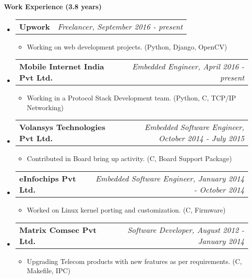 \documentclass[letterpaper,10pt]{article}
\makeatletter
\newcommand{\resitem}[1]{\item #1 \vspace{-2pt}}
\newcommand{\resheading}[1]{{\large \colorbox{mygrey}{\begin{minipage}{\textwidth}{\textbf{#1 \vphantom{p\^{E}}}}\end{minipage}}}}
\newcommand{\ressubheading}[4]{
\begin{tabular*}{7.0in}{l@{\extracolsep{\fill}}r}
		\textbf{#1} & \textit{#4} \\
\end{tabular*}\vspace{-6pt}}
\makeatother
\begin{document}
\resheading{Work Experience (3.8 years)}
\begin{itemize}

\item
	\ressubheading{Upwork}{Remote}{}{Freelancer, September 2016 - present}
	\begin{itemize}
		\resitem{Working on web development projects.}(Python, Django, OpenCV)
	\end{itemize}

\item
	\ressubheading{Mobile Internet India Pvt Ltd.}{Ahmedabad, India}{}{Embedded Engineer, April 2016 - present}
	\begin{itemize}
		\resitem{Working in a Protocol Stack Development team.}(Python, C, TCP/IP Networking)
	\end{itemize}

\item
	\ressubheading{Volansys Technologies Pvt Ltd.}{Ahmedabad, India}{}{Embedded Software Engineer, October 2014 - July 2015}
	\begin{itemize}
		\resitem{Contributed in Board bring up activity.}(C, Board Support Package)
	\end{itemize}

\item
	\ressubheading{eInfochips Pvt Ltd.}{Ahmedabad, India}{}{Embedded Software Engineer, January 2014 - October 2014}
	\begin{itemize}
		\resitem{Worked on Linux kernel porting and customization.}(C, Firmware)
	\end{itemize}

\item
	\ressubheading{Matrix Comsec Pvt Ltd.}{Ahmedabad, India}{}{Software Developer, August 2012 - January 2014}
	\begin{itemize}
		\resitem{Upgrading Telecom products with new features as per requirements.}(C, Makefile, IPC)
	\end{itemize}

\end{itemize}
\end{document}
